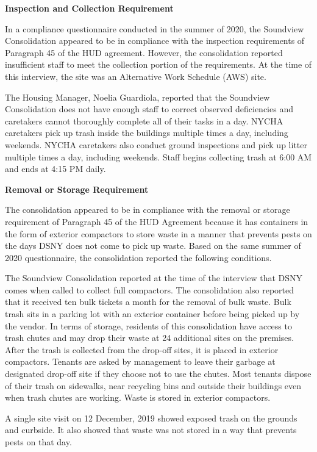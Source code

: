 

\textbf{Inspection and Collection Requirement}

In a compliance questionnaire conducted in the summer of 2020, the Soundview Consolidation appeared to be in compliance with the inspection requirements of Paragraph 45 of the HUD agreement. However, the consolidation reported insufficient staff to meet the collection portion of the requirements. At the time of this interview, the site was an Alternative Work Schedule (AWS) site. 

The Housing Manager, Noelia Guardiola, reported that the Soundview Consolidation does not have enough staff to correct observed deficiencies and caretakers cannot thoroughly complete all of their tasks in a day. NYCHA caretakers pick up trash inside the buildings multiple times a day, including weekends. NYCHA caretakers also conduct ground inspections and pick up litter multiple times a day, including weekends. Staff begins collecting trash at 6:00 AM and ends at 4:15 PM daily. 

\textbf{Removal or Storage Requirement}

The consolidation appeared to be in compliance with the  removal or storage requirement of Paragraph  45 of the HUD Agreement because it has containers in the form of exterior compactors to store waste in a manner that prevents pests on the days DSNY does not come to pick up waste. Based on the same summer of 2020 questionnaire, the consolidation reported the following conditions.

The Soundview Consolidation reported at the time of the interview that DSNY comes when called to collect full compactors. The consolidation also reported that it received ten bulk tickets a month for the removal of bulk waste. Bulk trash sits in a parking lot with an exterior container before being picked up by the vendor. In terms of storage, residents of this consolidation have access to trash chutes and may drop their waste at 24 additional sites on the premises. After the trash is collected from the drop-off sites, it is placed in exterior compactors. Tenants are asked by management to leave their garbage at designated drop-off site if they choose not to use the chutes. Most tenants dispose of their trash on sidewalks, near recycling bins and outside their buildings even when trash chutes are working. Waste is stored in exterior compactors. 

A single site visit on 12 December, 2019 showed exposed trash on the grounds and curbside. It also showed that waste was not stored in a way that prevents pests on that day. 

